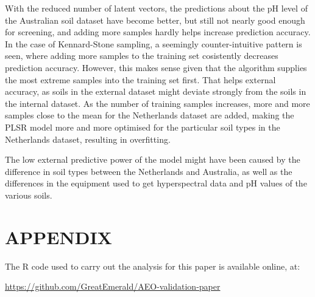 \documentclass{isprs}
\begin{document}
With the reduced number of latent vectors, the predictions about the pH level of the Australian soil dataset have become better, but still not nearly good enough for screening, and adding more samples hardly helps increase prediction accuracy. In the case of Kennard-Stone sampling, a seemingly counter-intuitive pattern is seen, where adding more samples to the training set cosistently decreases prediction accuracy. However, this makes sense given that the algorithm supplies the most extreme samples into the training set first. That helps external accuracy, as soils in the external dataset might deviate strongly from the soils in the internal dataset. As the number of training samples increases, more and more samples close to the mean for the Netherlands dataset are added, making the PLSR model more and more optimised for the particular soil types in the Netherlands dataset, resulting in overfitting.

The low external predictive power of the model might have been caused by the difference in soil types between the Netherlands and Australia, as well as the differences in the equipment used to get hyperspectral data and pH values of the various soils.

{%
	\begin{spacing}{0.9}%
		
	\end{spacing}
}

\section*{APPENDIX}\label{APPENDIX}

The R code used to carry out the analysis for this paper is available online, at:

\url{https://github.com/GreatEmerald/AEO-validation-paper}
\end{document}
